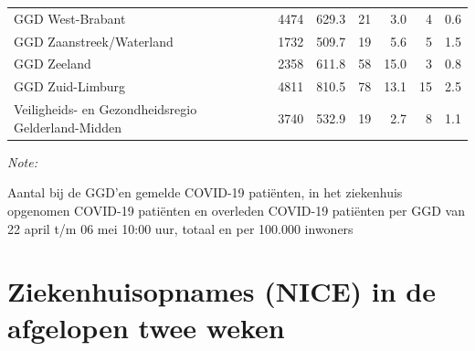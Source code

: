 \documentclass[
  english,
  man,floatsintext]{apa6}
\begin{document}
\begin{table}
\begin{threeparttable}
\begin{tabular}{lrrrrrr}
GGD West-Brabant & 4474 & 629.3 & 21 & 3.0 & 4 & 0.6\\
GGD Zaanstreek/Waterland & 1732 & 509.7 & 19 & 5.6 & 5 & 1.5\\
GGD Zeeland & 2358 & 611.8 & 58 & 15.0 & 3 & 0.8\\
GGD Zuid-Limburg & 4811 & 810.5 & 78 & 13.1 & 15 & 2.5\\
Veiligheids- en Gezondheidsregio Gelderland-Midden & 3740 & 532.9 & 19 & 2.7 & 8 & 1.1\\
\bottomrule
\end{tabular}
\begin{tablenotes}
\item \textit{Note: } 
\item Aantal bij de GGD’en gemelde COVID-19 patiënten, in het ziekenhuis opgenomen COVID-19 patiënten en overleden COVID-19 patiënten per GGD van 22 april t/m 06 mei 10:00 uur, totaal en per 100.000 inwoners
\end{tablenotes}
\end{threeparttable}
\endgroup{}
\end{table}

\newpage

\hypertarget{ziekenhuisopnames-nice-in-de-afgelopen-twee-weken}{%
\section{Ziekenhuisopnames (NICE) in de afgelopen twee weken}\label{ziekenhuisopnames-nice-in-de-afgelopen-twee-weken}}
\end{document}
